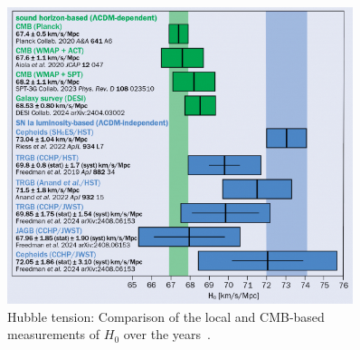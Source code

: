 \begin{figure}[h!]
    \centering
    \includegraphics[width=0.9\textwidth]{figures/CCMarApr25_Hubble_tension.jpg}
    \caption[Comparison of local and \ac{CMB}-based measurements of Hubble constant.]{Hubble tension: Comparison of the local and \ac{CMB}-based measurements of $H_0$ over the years~\citep{cern2025}.}
    \label{fig:hubble_tension}
\end{figure}

